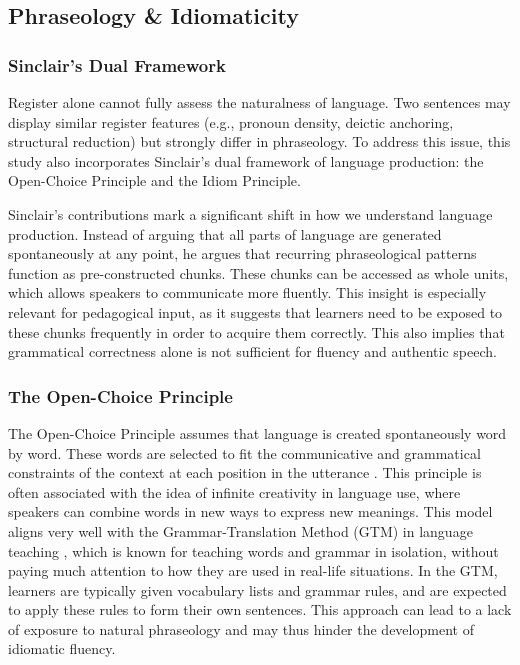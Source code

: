 \documentclass[11pt,a4paper]{article}
\begin{document}
\subsection{Phraseology \& Idiomaticity}\label{subsec:phraseology-idiomaticity}

\subsubsection{Sinclair's Dual Framework}\label{subsubsec:sinclair-framework}

Register alone cannot fully assess the naturalness of language. Two sentences may display similar register features (e.g., pronoun density, deictic anchoring, structural reduction) but strongly differ in phraseology. To address this issue, this study also incorporates Sinclair's \parencite*[109--110]{sinclairCorpusConcordanceCollocation1991} dual framework of language production: the Open-Choice Principle and the Idiom Principle.

Sinclair's contributions mark a significant shift in how we understand language production. Instead of arguing that all parts of language are generated spontaneously at any point, he argues that recurring phraseological patterns function as pre-constructed chunks. These chunks can be accessed as whole units, which allows speakers to communicate more fluently. This insight is especially relevant for pedagogical input, as it suggests that learners need to be exposed to these chunks frequently in order to acquire them correctly. This also implies that grammatical correctness alone is not sufficient for fluency and authentic speech. 

\subsubsection{The Open-Choice Principle}\label{subsubsec:open-choice}

The Open-Choice Principle assumes that language is created spontaneously word by word. These words are selected to fit the communicative and grammatical constraints of the context at each position in the utterance \parencite[109]{sinclairCorpusConcordanceCollocation1991}. This principle is often associated with the idea of infinite creativity in language use, where speakers can combine words in new ways to express new meanings. This model aligns very well with the Grammar-Translation Method (GTM) in language teaching \parencite{benati2018grammar}, which is known for teaching words and grammar in isolation, without paying much attention to how they are used in real-life situations. In the GTM, learners are typically given vocabulary lists and grammar rules, and are expected to apply these rules to form their own sentences. This approach can lead to a lack of exposure to natural phraseology and may thus hinder the development of idiomatic fluency.
\end{document}
